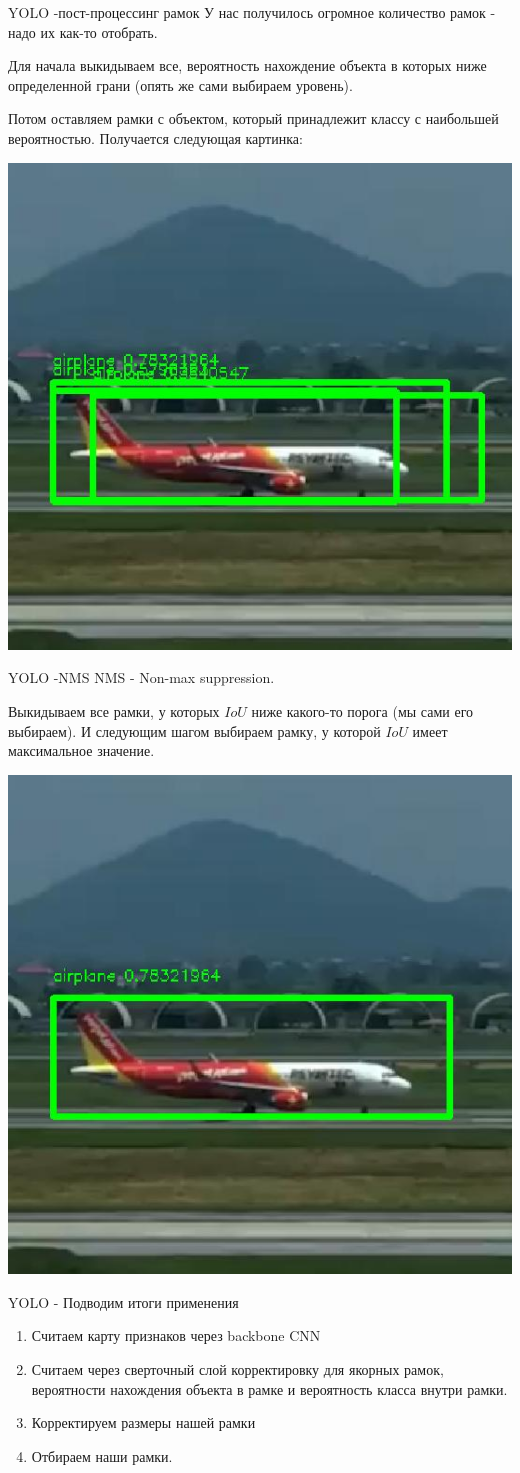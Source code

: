 \documentclass[notes,12pt, aspectratio=169]{beamer}
\begin{document}
\begin{frame}{YOLO -пост-процессинг рамок}
У нас получилось огромное количество рамок - надо их как-то отобрать.

Для начала выкидываем все, вероятность нахождение объекта в которых ниже определенной грани (опять же сами выбираем уровень).

Потом оставляем рамки с объектом, который принадлежит классу с наибольшей вероятностью. Получается следующая картинка:
\begin{center}
 \includegraphics[width=.4\linewidth]{full_boxes.jpg}
\end{center}
\end{frame}

\begin{frame}{YOLO -NMS}
NMS - Non-max suppression.

Выкидываем все рамки, у которых $IoU$ ниже какого-то порога (мы сами его выбираем). И следующим шагом выбираем рамку, у которой $IoU$ имеет максимальное значение.

\begin{center}
 \includegraphics[width=.4\linewidth]{NMS.jpg}
\end{center}
\end{frame}



\begin{frame}{YOLO - Подводим итоги применения}

 \begin{enumerate}
	\item Считаем карту признаков через backbone CNN
	\item Считаем через сверточный слой корректировку для якорных рамок, вероятности нахождения объекта в рамке и вероятность класса внутри рамки.
	\item Корректируем размеры нашей рамки
	\item Отбираем наши рамки.
\end{enumerate}


\end{frame}
\end{document}
